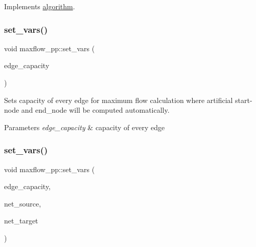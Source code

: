 Implements \mbox{\hyperlink{classalgorithm_a734b189509a8d6b56b65f8ff772d43ca}{algorithm}}.

\mbox{\label{classmaxflow__pp_ac77f4c613efe7857e053f9bfb103dc3e}} 
\subsubsection{\texorpdfstring{set\+\_\+vars()}{set\_vars()}\hspace{0.1cm}{\footnotesize\ttfamily [1/2]}}
{\footnotesize\ttfamily void maxflow\+\_\+pp\+::set\+\_\+vars (\begin{DoxyParamCaption}\item[{const \mbox{\hyperlink{classedge__map}{edge\+\_\+map}}$<$ double $>$ \&}]{edge\+\_\+capacity }\end{DoxyParamCaption})}

Sets capacity of every edge for maximum flow calculation where artificial start-\/node and end\+\_\+node will be computed automatically.


\begin{DoxyParams}{Parameters}
{\em edge\+\_\+capacity} & capacity of every edge \\
\hline
\end{DoxyParams}
\mbox{\label{classmaxflow__pp_a13756f76387cc114b88a44e324fc93ae}} 
\subsubsection{\texorpdfstring{set\+\_\+vars()}{set\_vars()}\hspace{0.1cm}{\footnotesize\ttfamily [2/2]}}
{\footnotesize\ttfamily void maxflow\+\_\+pp\+::set\+\_\+vars (\begin{DoxyParamCaption}\item[{const \mbox{\hyperlink{classedge__map}{edge\+\_\+map}}$<$ double $>$ \&}]{edge\+\_\+capacity,  }\item[{const \mbox{\hyperlink{classnode}{node}} \&}]{net\+\_\+source,  }\item[{const \mbox{\hyperlink{classnode}{node}} \&}]{net\+\_\+target }\end{DoxyParamCaption})}

